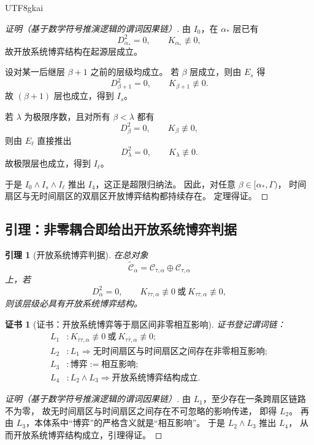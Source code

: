 \documentclass[12pt]{article}
\newtheorem{lemma}{引理}[section]
\newtheorem{Certificate}{证书}[section]
\begin{document}
\begin{CJK*}{UTF8}{gkai}
\begin{proof}[证明（基于数学符号推演逻辑的谓词因果链）]
由 $I_0$，在 $\alpha_\ast$ 层已有
\[
  D_{\alpha_\ast}^2=0,
  \qquad
  K_{\alpha_\ast}\not\equiv 0,
\]
故开放系统博弈结构在起源层成立。

设对某一后继层 $\beta+1$ 之前的层级均成立。
若 $\beta$ 层成立，则由 $E_s$ 得
\[
  D_{\beta+1}^2=0,
  \qquad
  K_{\beta+1}\not\equiv 0.
\]
故 $(\beta+1)$ 层也成立，得到 $I_s$。

若 $\lambda$ 为极限序数，且对所有 $\beta<\lambda$ 都有
\[
  D_\beta^2=0,
  \qquad
  K_\beta\not\equiv 0,
\]
则由 $E_\ell$ 直接推出
\[
  D_\lambda^2=0,
  \qquad
  K_\lambda\not\equiv 0.
\]
故极限层也成立，得到 $I_\ell$。

于是 $I_0\wedge I_s\wedge I_\ell$ 推出 $I_4$，这正是超限归纳法。
因此，对任意 $\beta\in[\alpha_\ast,\Gamma)$，
时间扇区与无时间扇区的双扇区开放博弈结构都持续存在。
定理得证。
\end{proof}

\subsection{引理：非零耦合即给出开放系统博弈判据}
\label{subsec:tex43-ch10-lemma}

\begin{lemma}[开放系统博弈判据]
\label{lem:tex43-open-game-criterion}
在总对象
\[
  \widetilde{\mathcal C}_\alpha
  =
  \mathcal C_{\bar\tau,\alpha}\oplus \mathcal C_{\tau,\alpha}
\]
上，若
\[
  D_\alpha^2=0,
  \qquad
  K_{\bar\tau\tau,\alpha}\not\equiv 0
  \ \text{或}\
  K_{\tau\bar\tau,\alpha}\not\equiv 0,
\]
则该层级必具有开放系统博弈结构。
\end{lemma}

\begin{Certificate}[证书：开放系统博弈等于扇区间非零相互影响]
\label{cert:tex43-open-game-criterion}
证书登记谓词链：
\[
\begin{aligned}
  L_1 &: K_{\bar\tau\tau,\alpha}\not\equiv 0
         \ \text{或}\
         K_{\tau\bar\tau,\alpha}\not\equiv 0;\\
  L_2 &: L_1 \Rightarrow
         \text{无时间扇区与时间扇区之间存在非零相互影响};\\
  L_3 &: \text{博弈} := \text{相互影响};\\
  L_4 &: L_2\wedge L_3 \Rightarrow \text{开放系统博弈结构成立}.
\end{aligned}
\]
\end{Certificate}

\begin{proof}[证明（基于数学符号推演逻辑的谓词因果链）]
由 $L_1$，至少存在一条跨扇区链路不为零，
故无时间扇区与时间扇区之间存在不可忽略的影响传递，
即得 $L_2$。
再由 $L_3$，本体系中“博弈”的严格含义就是“相互影响”。
于是 $L_2\wedge L_3$ 推出 $L_4$，
从而开放系统博弈结构成立，引理得证。
\end{proof}


\end{CJK*}
\end{document}
